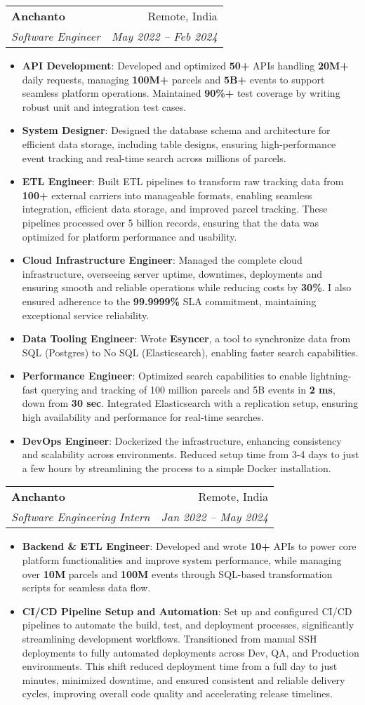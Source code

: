 \documentclass[letterpaper,11pt]{article}
\makeatletter
\newcommand{\resumeItem}[2]{
  \item\small{
    \textbf{#1}{: #2 \vspace{-2pt}}
  }
}
\newcommand{\resumeSubheading}[4]{
  \vspace{-1pt}\item
    \begin{tabular*}{0.97\textwidth}[t]{l@{\extracolsep{\fill}}r}
      \textbf{#1} & #2 \\
      \textit{\small#3} & \textit{\small #4} \\
    \end{tabular*}\vspace{-5pt}
}
\newcommand{\resumeItemListStart}{\begin{itemize}}
\newcommand{\resumeItemListEnd}{\end{itemize}\vspace{-5pt}}
\makeatother
\begin{document}
  \resumeSubheading
    {Anchanto}{Remote, India}
    {Software Engineer}{May 2022 -- Feb 2024}
    \resumeItemListStart
      \resumeItem{API Development}
        {Developed and optimized \textbf{50+} APIs handling \textbf{20M+} daily requests, managing \textbf{100M+} parcels and \textbf{5B+} events to support seamless platform operations. Maintained \textbf{90\%+} test coverage by writing robust unit and integration test cases.}
      \resumeItem{System Designer}
        {Designed the database schema and architecture for efficient data storage, including table designs, ensuring high-performance event tracking and real-time search across millions of parcels.}
      \resumeItem{ETL Engineer}
        {Built ETL pipelines to transform raw tracking data from \textbf{100+} external carriers into manageable formats, enabling seamless integration, efficient data storage, and improved parcel tracking. These pipelines processed over 5 billion records, ensuring that the data was optimized for platform performance and usability.}
      \resumeItem{Cloud Infrastructure Engineer}
        {Managed the complete cloud infrastructure, overseeing server uptime, downtimes, deployments and ensuring smooth and reliable operations while reducing costs by \textbf{30\%}. I also ensured adherence to the \textbf{99.9999\%} SLA commitment, maintaining exceptional service reliability.}
      \resumeItem{Data Tooling Engineer}
        {Wrote \textbf{Esyncer}, a tool to synchronize data from SQL (Postgres) to No SQL (Elasticsearch), enabling faster search capabilities.}
      \resumeItem{Performance Engineer}
        {Optimized search capabilities to enable lightning-fast querying and tracking of 100 million parcels and 5B events in \textbf{2 ms}, down from \textbf{30 sec}. Integrated Elasticsearch with a replication setup, ensuring high availability and performance for real-time searches.}
      \resumeItem{DevOps Engineer}
        {Dockerized the infrastructure, enhancing consistency and scalability across environments. Reduced setup time from 3-4 days to just a few hours by streamlining the process to a simple Docker installation.}      \resumeItemListEnd
  \resumeSubheading
        {Anchanto}{Remote, India}
        {Software Engineering Intern}{Jan 2022 -- May 2024}
      \resumeItemListStart
      \resumeItem{Backend \& ETL Engineer}
        {Developed and wrote \textbf{10+} APIs to power core platform functionalities and improve system performance, while managing over \textbf{10M} parcels and \textbf{100M} events through SQL-based transformation scripts for seamless data flow.}
      \resumeItem{CI/CD Pipeline Setup and Automation}
        {Set up and configured CI/CD pipelines to automate the build, test, and deployment processes, significantly streamlining development workflows. Transitioned from manual SSH deployments to fully automated deployments across Dev, QA, and Production environments. This shift reduced deployment time from a full day to just minutes, minimized downtime, and ensured consistent and reliable delivery cycles, improving overall code quality and accelerating release timelines.}      \resumeItemListEnd
\end{document}
